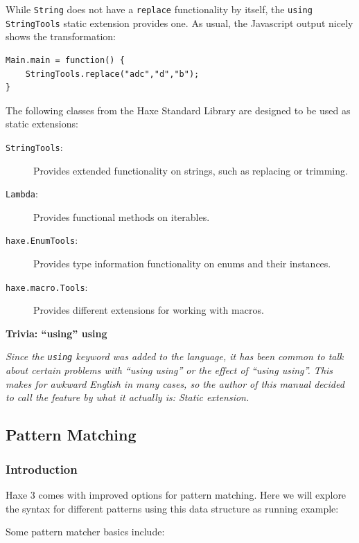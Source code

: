 \documentclass{article}
\newcommand{\target}[1]{#1}
\newcommand{\type}[1]{\texttt{#1}}
\newcommand{\expr}[1]{\texttt{#1}}
\newenvironment{myshaded}
  {\def\FrameCommand{\fboxsep=\topsep\colorbox{bgcolor}}%
  \MakeFramed {\advance\hsize-\width \FrameRestore}}%
 {\endMakeFramed}
\newcommand{\trivia}[2]
	{\begin{myshaded}\noindent\textbf{Trivia: #1}\par\nobreak\noindent\ignorespaces\textit{#2}\end{myshaded}}
\begin{document}
While \type{String} does not have a \expr{replace} functionality by itself, the \expr{using StringTools} static extension provides one. As usual, the \target{Javascript} output nicely shows the transformation:

\begin{lstlisting}
Main.main = function() {
	StringTools.replace("adc","d","b");
}
\end{lstlisting}

The following classes from the Haxe Standard Library are designed to be used as static extensions:

\begin{description}
	\item[\type{StringTools}:] Provides extended functionality on strings, such as replacing or trimming.
	\item[\type{Lambda}:] Provides functional methods on iterables.
	\item[\type{haxe.EnumTools}:] Provides type information functionality on enums and their instances.
	\item[\type{haxe.macro.Tools}:] Provides different extensions for working with macros.
\end{description}



\trivia{``using'' using}{Since the \expr{using} keyword was added to the language, it has been common to talk about certain problems with ``using using'' or the effect of ``using using''. This makes for awkward English in many cases, so the author of this manual decided to call the feature by what it actually is: Static extension.}



\subsection{Pattern Matching}
\label{Pattern Matching}

\subsubsection{Introduction}

Haxe 3 comes with improved options for pattern matching. Here we will explore the syntax for different patterns using this data structure as running example:



Some pattern matcher basics include:
\end{document}
